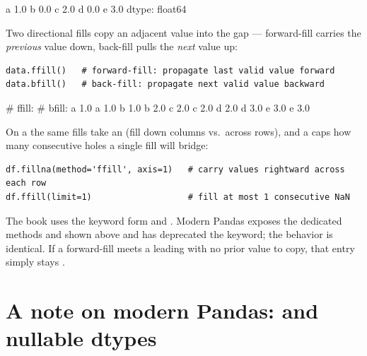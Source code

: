 \documentclass[11pt]{article}
\begin{document}
\begin{outblock}
a    1.0
b    0.0
c    2.0
d    0.0
e    3.0
dtype: float64
\end{outblock}

Two directional fills copy an adjacent value into the gap --- forward-fill carries the \emph{previous} value down, back-fill pulls the \emph{next} value up:

\begin{lstlisting}
data.ffill()   # forward-fill: propagate last valid value forward
data.bfill()   # back-fill: propagate next valid value backward
\end{lstlisting}

\begin{outblock}
# ffill:                 # bfill:
a    1.0                 a    1.0
b    1.0                 b    2.0
c    2.0                 c    2.0
d    2.0                 d    3.0
e    3.0                 e    3.0
\end{outblock}

On a  the same fills take an  (fill down columns vs.\ across rows), and a  caps how many consecutive holes a single fill will bridge:

\begin{lstlisting}
df.fillna(method='ffill', axis=1)   # carry values rightward across each row
df.ffill(limit=1)                   # fill at most 1 consecutive NaN
\end{lstlisting}

\begin{pyrefresh}
The book uses the keyword form  and . Modern Pandas exposes the dedicated methods  and  shown above and has deprecated the  keyword; the behavior is identical. If a forward-fill meets a leading  with no prior value to copy, that entry simply stays .
\end{pyrefresh}

\section{A note on modern Pandas:  and nullable dtypes}
\end{document}
